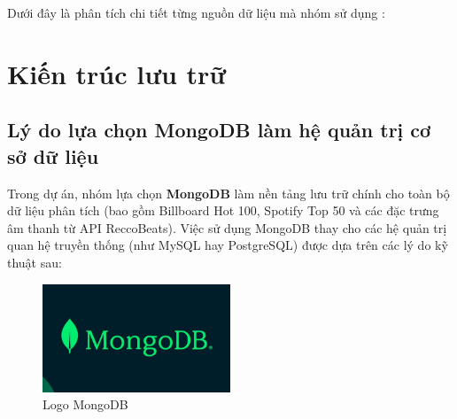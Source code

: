 \documentclass{../hcmut-report}
\begin{document}
\large{Dưới đây là phân tích chi tiết từng nguồn dữ liệu mà nhóm sử dụng :}

% 




\section{Kiến trúc lưu trữ}

\subsection{Lý do lựa chọn MongoDB làm hệ quản trị cơ sở dữ liệu}

Trong dự án, nhóm lựa chọn \textbf{MongoDB} làm nền tảng lưu trữ chính cho toàn bộ dữ liệu phân tích (bao gồm Billboard Hot 100, Spotify Top 50 và các đặc trưng âm thanh từ API ReccoBeats).  
Việc sử dụng MongoDB thay cho các hệ quản trị quan hệ truyền thống (như MySQL hay PostgreSQL) được dựa trên các lý do kỹ thuật sau:


\begin{figure}[H] %
    \centering %
    \includegraphics[width=0.5\textwidth]{../graphics/data_top50/mongoDB_logo.png} %
    \caption{Logo MongoDB} %
    \label{fig:example} %
\end{figure}
\end{document}
